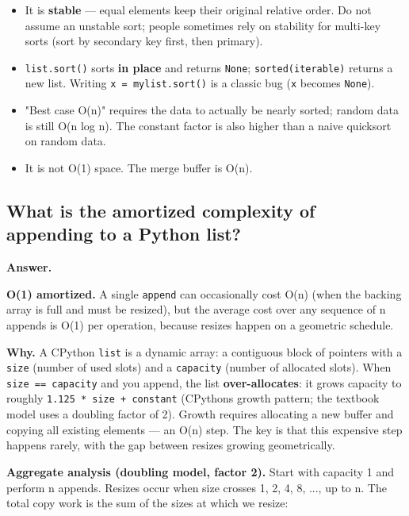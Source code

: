 \documentclass[11pt]{article}
\providecommand{\tightlist}{\setlength{\itemsep}{1pt}\setlength{\parskip}{0pt}}
\begin{document}
\begin{itemize}
\tightlist
\item
  It is \textbf{stable} --- equal elements keep their original relative order. Do not assume an unstable sort; people sometimes rely on stability for multi-key sorts (sort by secondary key first, then primary).
\item
  \texttt{list.sort()} sorts \textbf{in place} and returns \texttt{None}; \texttt{sorted(iterable)} returns a new list. Writing \texttt{x\ =\ mylist.sort()} is a classic bug (\texttt{x} becomes \texttt{None}).
\item
  "Best case O(n)" requires the data to actually be nearly sorted; random data is still O(n log n). The constant factor is also higher than a naive quicksort on random data.
\item
  It is not O(1) space. The merge buffer is O(n).
\end{itemize}

\subsection{What is the amortized complexity of appending to a Python list?}\label{what-is-the-amortized-complexity-of-appending-to-a-python-list}

\textbf{Answer.}

\textbf{O(1) amortized.} A single \texttt{append} can occasionally cost O(n) (when the backing array is full and must be resized), but the average cost over any sequence of n appends is O(1) per operation, because resizes happen on a geometric schedule.

\textbf{Why.} A CPython \texttt{list} is a dynamic array: a contiguous block of pointers with a \texttt{size} (number of used slots) and a \texttt{capacity} (number of allocated slots). When \texttt{size\ ==\ capacity} and you append, the list \textbf{over-allocates}: it grows capacity to roughly \texttt{1.125\ *\ size\ +\ constant} (CPython\textquotesingle s growth pattern; the textbook model uses a doubling factor of 2). Growth requires allocating a new buffer and copying all existing elements --- an O(n) step. The key is that this expensive step happens rarely, with the gap between resizes growing geometrically.

\textbf{Aggregate analysis (doubling model, factor 2).} Start with capacity 1 and perform n appends. Resizes occur when size crosses 1, 2, 4, 8, ..., up to n. The total copy work is the sum of the sizes at which we resize:
\end{document}
